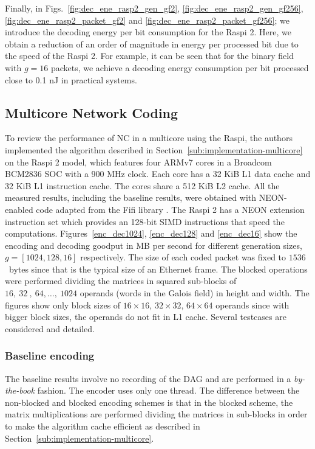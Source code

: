 %
Finally, in Figs.~\ref{fig:dec_ene_rasp2_gen_gf2},
\ref{fig:dec_ene_rasp2_gen_gf256}, \ref{fig:dec_ene_rasp2_packet_gf2}
and \ref{fig:dec_ene_rasp2_packet_gf256}; we introduce the decoding energy
per bit consumption for the \ac{Raspi} 2. Here, we obtain a reduction
of an order of magnitude in energy per processed bit due to the speed
of the \ac{Raspi} 2. For example, it can be seen that for the binary field
with $g = 16$ packets, we achieve a decoding energy consumption per bit 
processed close to 0.1 nJ in practical systems.
%
\subsection{Multicore Network Coding}
\label{subs:multicore-network-coding}

To review the performance of \ac{NC} in a multicore using the \ac{Raspi},
the authors implemented the algorithm described in
Section~\ref{sub:implementation-multicore} on the \ac{Raspi} 2 model,
which features four ARMv7 cores in a Broadcom BCM2836 \ac{SOC}
with a 900 MHz clock. Each core has a 32 KiB L1 data cache and 32 KiB
L1 instruction cache. The cores share a 512 KiB L2 cache. All the
measured results, including the baseline results, were obtained with
NEON-enabled code adapted from the Fifi library \cite{fifi}.
The \ac{Raspi} 2 has a NEON extension instruction set which provides
an 128-bit \ac{SIMD} instructions that speed the computations.
Figures~\ref{enc_dec1024}, \ref{enc_dec128} and
\ref{enc_dec16} show the encoding and decoding goodput in MB per
second for different generation sizes, $g = [1024, 128, 16]$
respectively. The size of each coded packet was fixed to $1536$~bytes
since that is the typical size of an Ethernet frame. The blocked operations
were performed dividing the matrices in squared sub-blocks of
$16,\ 32\ ,\ 64,\ldots,\ 1024$ operands (words in the Galois field) in
height and width. The figures show only block sizes of
$16 \times 16$, $32 \times 32$, $64 \times 64$ operands since with bigger
block sizes, the operands do not fit in L1 cache. Several testcases
are considered and detailed.

\subsubsection{Baseline encoding}
The baseline results involve no recording of the
\ac{DAG} and are performed in a \emph{by-the-book} fashion. The encoder uses
only one thread. The difference between the non-blocked and blocked
encoding schemes is that in the blocked scheme, the matrix multiplications are
performed dividing the matrices in sub-blocks in order to make the algorithm
cache efficient as described in Section~\ref{sub:implementation-multicore}.

